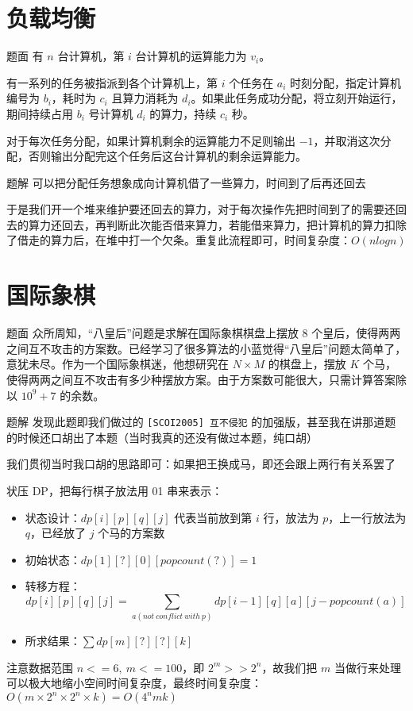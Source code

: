 \documentclass{pptt}
\begin{document}
\section{负载均衡}

\begin{frame}{题面}
    有 $n$ 台计算机，第 $i$ 台计算机的运算能力为 $v_i$。

    有一系列的任务被指派到各个计算机上，第 $i$ 个任务在 $a_i$ 时刻分配，指定计算机编号为 $b_i$，耗时为 $c_i$ 且算力消耗为 $d_i$。如果此任务成功分配，将立刻开始运行，期间持续占用 $b_i$ 号计算机 $d_i$ 的算力，持续 $c_i$ 秒。

    对于每次任务分配，如果计算机剩余的运算能力不足则输出 $-1$，并取消这次分配，否则输出分配完这个任务后这台计算机的剩余运算能力。
\end{frame}

\begin{frame}{题解}
    可以把分配任务想象成向计算机借了一些算力，时间到了后再还回去

    于是我们开一个堆来维护要还回去的算力，对于每次操作先把时间到了的需要还回去的算力还回去，再判断此次能否借来算力，若能借来算力，把计算机的算力扣除了借走的算力后，在堆中打一个欠条。重复此流程即可，时间复杂度：$O(nlogn)$
\end{frame}

\section{国际象棋}

\begin{frame}{题面}
    众所周知，“八皇后”问题是求解在国际象棋棋盘上摆放 $8$ 个皇后，使得两两之间互不攻击的方案数。已经学习了很多算法的小蓝觉得“八皇后”问题太简单了，意犹未尽。作为一个国际象棋迷，他想研究在 $N \times M$ 的棋盘上，摆放 $K$ 个马，使得两两之间互不攻击有多少种摆放方案。由于方案数可能很大，只需计算答案除以 ${10}^9+7$ 的余数。
\end{frame}

\begin{frame}{题解}
    发现此题即我们做过的 \texttt{[SCOI2005] 互不侵犯} 的加强版，甚至我在讲那道题的时候还口胡出了本题（当时我真的还没有做过本题，纯口胡）

    我们贯彻当时我口胡的思路即可：如果把王换成马，即还会跟上两行有关系罢了

    状压 DP，把每行棋子放法用 01 串来表示：

    \begin{itemize}
        \item 状态设计：$dp[i][p][q][j]$ 代表当前放到第 $i$ 行，放法为 $p$，上一行放法为 $q$，已经放了 $j$ 个马的方案数
        \item 初始状态：$dp[1][?][0][popcount(?)] = 1$
        \item 转移方程：$$dp[i][p][q][j] = \sum_{a(not\ conflict\ with\ p)} dp[i-1][q][a][j-popcount(a)]$$
        \item 所求结果：$\sum dp[m][?][?][k]$
    \end{itemize}

    注意数据范围 $n<=6,~m<=100$，即 $2^m >> 2^n$，故我们把 $m$ 当做行来处理可以极大地缩小空间时间复杂度，最终时间复杂度：$O(m \times 2^n \times 2^n \times k) = O(4^nmk)$
\end{frame}
\end{document}

